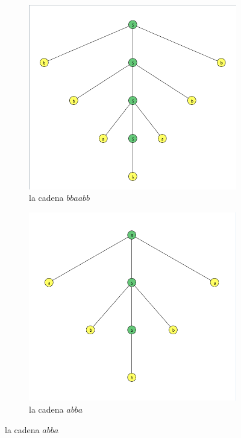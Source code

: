 \documentclass{article}
\begin{document}
\begin{flushleft}
\begin{enumerate}
\begin{figure}[h]
\begin{subfigure}[b]{0.45\textwidth}
                        \includegraphics[width=\textwidth]{./Imagenes/grafo9.png}
                        \caption{la cadena $bbaabb$}
                        \label{fig:label20}
                    \end{subfigure}
                    \hfill
                    \begin{subfigure}[b]{0.45\textwidth}
                        \centering
                        \includegraphics[width=\textwidth]{./Imagenes/grafo10.png}
                        \caption{la cadena $abba$}
                        \label{fig:label21}
                    \end{subfigure}
                    \label{fig:matrix5}
                \end{figure}

            \end{enumerate}
        \end{flushleft}
\end{document}
